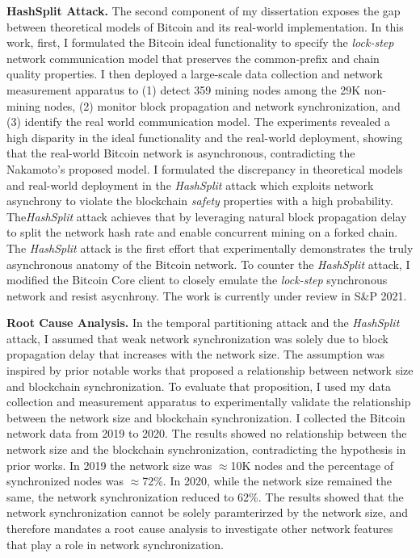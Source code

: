 \documentclass{NSF}
\newcommand{\BfPara}[1]{{\noindent\textbf{#1.}}\xspace}
\begin{document}
\vspace{2mm}
\BfPara{HashSplit Attack} The second component of my dissertation exposes the gap between theoretical models of Bitcoin and its real-world implementation. In this work, first, I formulated the Bitcoin ideal functionality to specify the {\em lock-step} network communication model that preserves the common-prefix and chain quality properties. I then deployed a large-scale data collection and network measurement apparatus to (1) detect 359 mining nodes among the 29K non-mining nodes, (2) monitor block propagation and network synchronization, and (3) identify the real world communication model. The experiments revealed a high disparity in the ideal functionality and the real-world deployment, showing that the real-world Bitcoin network is asynchronous, contradicting the Nakamoto's proposed model. I formulated the discrepancy in theoretical models and real-world deployment in the {\em HashSplit} attack which exploits network asynchrony to violate the blockchain {\em safety} properties with a high probability. The{\em HashSplit} attack achieves that by leveraging natural block propagation delay to split the network hash rate and enable concurrent mining on a forked chain. The {\em HashSplit} attack is the first effort that experimentally demonstrates the truly asynchronous anatomy of the Bitcoin network. To counter the {\em HashSplit} attack, I modified the Bitcoin Core client to closely emulate the {\em lock-step} synchronous network and resist asycnhrony. The work is currently under review in S\&P 2021. 


\vspace{2mm}
\BfPara{Root Cause Analysis} In the temporal partitioning attack and the {\em HashSplit} attack, I assumed that weak network synchronization was solely due to block propagation delay that increases with the network size. The assumption was inspired by prior notable works that proposed a relationship between network size and blockchain synchronization. To evaluate that proposition, I used my data collection and measurement apparatus to experimentally validate the relationship between the network size and blockchain synchronization. I collected the Bitcoin network data from 2019 to 2020. The results showed no relationship between the network size and the blockchain synchronization, contradicting the hypothesis in prior works. In 2019 the network size was $\approx$10K nodes and the percentage of synchronized nodes was $\approx$72\%. In 2020, while the network size remained the same, the network synchronization reduced to 62\%. The results showed that the network synchronization cannot be solely paramterirzed by the network size, and therefore mandates a root cause analysis to investigate other network features that play a role in network synchronization. 
\end{document}
